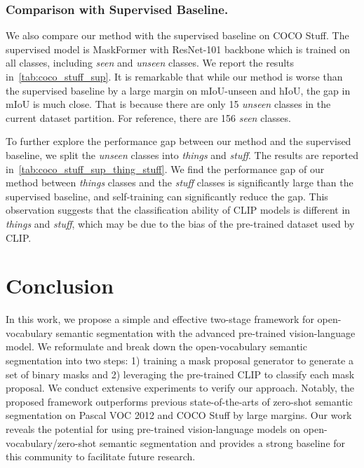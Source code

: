 \documentclass[runningheads]{llncs}
\begin{document}
\subsubsection{Comparison with Supervised Baseline.}

We also compare our method with the supervised baseline on COCO Stuff. The supervised model is MaskFormer with ResNet-101 backbone which is trained on all classes, including \emph{seen} and \emph{unseen} classes. We report the results in~\cref{tab:coco_stuff_sup}. 
It is remarkable that while our method is worse than the supervised baseline by a large margin on mIoU-unseen and hIoU, the gap in mIoU is much close. That is because there are only 15 \emph{unseen} classes in the current dataset partition. For reference, there are 156 \emph{seen} classes.

To further explore the performance gap between our method and the supervised baseline, we split the \emph{unseen}  classes into \emph{things} and \emph{stuff}. The results are reported in~\cref{tab:coco_stuff_sup_thing_stuff}. We find the performance gap of our method between \emph{things} classes and the \emph{stuff} classes is significantly large than the supervised baseline, and self-training can significantly reduce the gap. This observation suggests that the classification ability of CLIP models is different in \emph{things} and \emph{stuff}, which may be due to the bias of the pre-trained dataset used by CLIP.

\section{Conclusion}
In this work, we propose a simple and effective two-stage framework for open-vocabulary semantic segmentation with the advanced pre-trained vision-language model. We reformulate and break down the open-vocabulary semantic segmentation into two steps: 1) training a mask proposal generator to generate a set of binary masks and 2) leveraging the pre-trained CLIP to classify each mask proposal. We conduct extensive experiments to verify our approach. Notably, the proposed framework outperforms previous state-of-the-arts of zero-shot semantic segmentation on Pascal VOC 2012 and COCO Stuff by large margins. Our work reveals the potential for using pre-trained vision-language models on open-vocabulary/zero-shot semantic segmentation and provides a strong baseline for this community to facilitate future research.

\appendix
\end{document}

